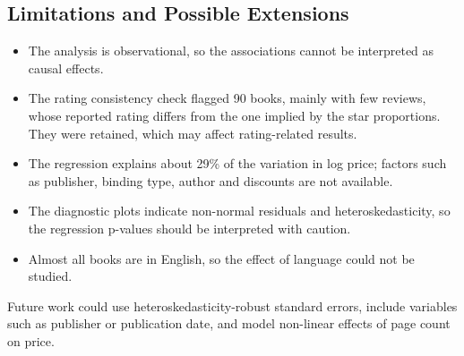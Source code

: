 \documentclass[11pt,a4paper]{article}
\begin{document}
\subsection{Limitations and Possible Extensions}

\begin{itemize}
    \setlength{\itemsep}{2pt}
    \item The analysis is observational, so the associations cannot be interpreted as causal effects.
    \item The rating consistency check flagged 90 books, mainly with few reviews, whose reported rating differs from the one implied by the star proportions. They were retained, which may affect rating-related results.
    \item The regression explains about 29\% of the variation in log price; factors such as publisher, binding type, author and discounts are not available.
    \item The diagnostic plots indicate non-normal residuals and heteroskedasticity, so the regression p-values should be interpreted with caution.
    \item Almost all books are in English, so the effect of language could not be studied.
\end{itemize}

Future work could use heteroskedasticity-robust standard errors, include variables such as publisher or publication date, and model non-linear effects of page count on price.

\endgroup
\end{document}
